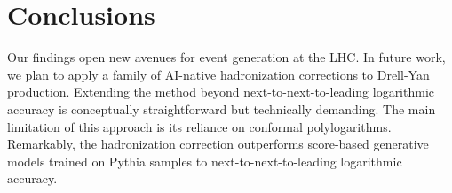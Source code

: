 \section{Conclusions}\label{sec:conclusions}

Our findings open new avenues for event generation at the LHC. In future
work, we plan to apply a family of AI-native hadronization corrections
to Drell-Yan production. Extending the method beyond
next-to-next-to-leading logarithmic accuracy is conceptually
straightforward but technically demanding. The main limitation of this
approach is its reliance on conformal polylogarithms. Remarkably, the
hadronization correction outperforms score-based generative models
trained on Pythia samples to next-to-next-to-leading logarithmic
accuracy.


